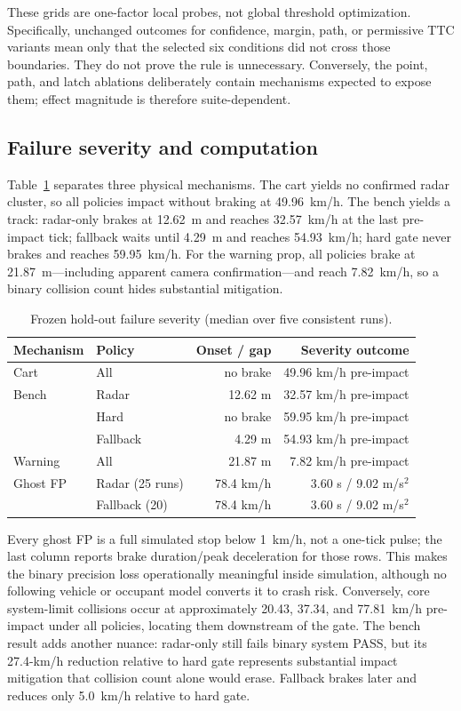 \documentclass[conference]{IEEEtran}
\begin{document}
These grids are one-factor local probes, not global threshold optimization.
Specifically, unchanged outcomes for confidence, margin, path, or permissive TTC
variants mean only that the selected six conditions did not cross those
boundaries. They do not prove the rule is unnecessary. Conversely, the point,
path, and latch ablations deliberately contain mechanisms expected to expose
them; effect magnitude is therefore suite-dependent.

\subsection{Failure severity and computation}
Table~\ref{tab:severity} separates three physical mechanisms. The cart yields no
confirmed radar cluster, so all policies impact without braking at 49.96~km/h.
The bench yields a track: radar-only brakes at 12.62~m and reaches 32.57~km/h at
the last pre-impact tick; fallback waits until 4.29~m and reaches 54.93~km/h;
hard gate never brakes and reaches 59.95~km/h. For the warning prop, all policies
brake at 21.87~m---including apparent camera confirmation---and reach
7.82~km/h, so a binary collision count hides substantial mitigation.

\begin{table}[t]
\caption{Frozen hold-out failure severity (median over five consistent runs).}
\label{tab:severity}
\centering\scriptsize
\setlength{\tabcolsep}{3pt}
\begin{tabular}{llrr}
\toprule Mechanism & Policy & Onset / gap & Severity outcome\\ \midrule
Cart & All & no brake & 49.96 km/h pre-impact\\
Bench & Radar & 12.62 m & 32.57 km/h pre-impact\\
 & Hard & no brake & 59.95 km/h pre-impact\\
 & Fallback & 4.29 m & 54.93 km/h pre-impact\\
Warning & All & 21.87 m & 7.82 km/h pre-impact\\
\midrule
Ghost FP & Radar (25 runs) & 78.4 km/h & 3.60 s / 9.02 m/s$^2$\\
 & Fallback (20) & 78.4 km/h & 3.60 s / 9.02 m/s$^2$\\
\bottomrule
\end{tabular}
\end{table}

Every ghost FP is a full simulated stop below 1~km/h, not a one-tick pulse; the
last column reports brake duration/peak deceleration for those rows. This makes
the binary precision loss operationally meaningful inside simulation, although
no following vehicle or occupant model converts it to crash risk. Conversely,
core system-limit collisions occur at approximately 20.43, 37.34, and
77.81~km/h pre-impact under all policies, locating them downstream of the gate.
The bench result adds another nuance: radar-only still fails binary system PASS,
but its 27.4-km/h reduction relative to hard gate represents substantial impact
mitigation that collision count alone would erase. Fallback brakes later and
reduces only 5.0~km/h relative to hard gate.
\end{document}
